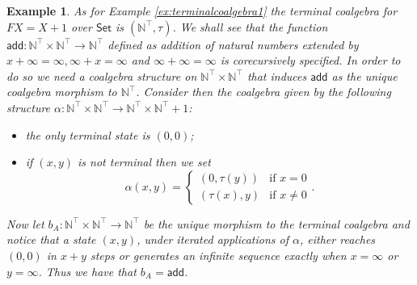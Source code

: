 \documentclass[letterpaper, 11pt, oneside]{memoir}
\theoremstyle{myteo}
\newtheorem{example}[theorem]{Example}
\numberwithin{equation}{section}
\newcommand{\Set}{\textsf{Set}}
\begin{document}
\begin{example}
  \label{ex:corecursive-specification-of-addition}
  As for Example \ref{ex:terminalcoalgebra1} the terminal coalgebra for \(FX = X + 1\) over \(\Set\) is \((\mathbb{N}^\top, \tau)\).
  We shall see that the function \(\textsf{add} : \mathbb{N}^\top \times \mathbb{N}^\top \to \mathbb{N}^\top\) defined as addition of natural numbers extended by \(x + \infty = \infty, \infty + x = \infty\) and \(\infty + \infty = \infty\) is corecursively specified.
  In order to do so we need a coalgebra structure on \(\mathbb{N}^\top \times \mathbb{N}^\top\) that induces \(\textsf{add}\) as the unique coalgebra morphism to \(\mathbb{N}^\top\).
  Consider then the coalgebra given by the following structure \(\alpha: \mathbb{N}^\top \times \mathbb{N}^\top \to \mathbb{N}^\top \times \mathbb{N}^\top + 1\):
  \begin{itemize}
  \item[1.] the only terminal state is \((0, 0)\);
  \item[2.] if \((x, y)\) is not terminal then we set
    \begin{equation*}
      \alpha(x, y) =
      \begin{cases}
        (0, \tau(y)) & \text{if } x = 0\\
        (\tau(x), y) & \text{if } x \neq 0
      \end{cases}.
    \end{equation*}
  \end{itemize}
  Now let \(b_A : \mathbb{N}^\top \times \mathbb{N}^\top \to \mathbb{N}^\top\) be the unique morphism to the terminal coalgebra and notice that a state \((x, y)\), under iterated applications of \(\alpha\), either reaches \((0, 0)\) in \(x + y\) steps or generates an infinite sequence exactly when \(x = \infty\) or \(y = \infty\).
  Thus we have that \(b_A = \textsf{add}\).
\end{example}

\printbibliography
\end{document}
